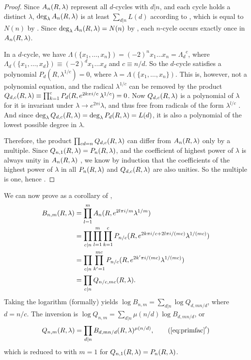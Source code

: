 \documentclass[twocolumn]{revtex4-1}
\begin{document}
\begin{proof}
Since $A_n(R, \lambda)$ represent all $d$-cycles with $d|n$,
and each cycle holds a distinct $\lambda$,
  $\deg_\lambda A_n(R, \lambda)$
  is at least $\sum_{d|n} L(d)$
  according to ,
  which is equal to
  $N(n)$ by .
Since $\deg_\lambda A_n(R, \lambda) = N(n)$ by ,
  each $n$-cycle occurs exactly once in $A_n(R, \lambda)$.


In a $d$-cycle,
 we have $\Lambda(\{x_1, \ldots, x_n\}) = (-2)^n x_1 \dots x_n
   = {\Lambda_d}^c$,
where
$\Lambda_d(\{x_1, \ldots, x_d\}) \equiv (-2)^d x_1 \dots x_d$
and
$c \equiv n/d$.
So the $d$-cycle satisfies a polynomial
  $P_d(R, \lambda^{1/c}) = 0$,
where $\lambda = \Lambda(\{x_1,\ldots,x_n\})$.
%
This is, however, not a polynomial equation, and
%
the radical $\lambda^{1/c}$ can be removed by the product
$Q_{d,c}(R, \lambda)
  \equiv \prod_{k=1}^c P_d(R, e^{2k\pi i/c} \, \lambda^{1/c}) = 0$.
%
Now $Q_{d,c}(R, \lambda)$ is a polynomial of $\lambda$
  for it is invariant under
  $\lambda \rightarrow e^{2\pi i} \lambda$,
and thus free from radicals of the form $\lambda^{l/c}$
  \big[if $(l, c) \ne c$\big].
And since
  $\deg_\lambda Q_{d,c}(R, \lambda)
    = \deg_\lambda P_d(R, \lambda) = L(d)$,
  it is also a polynomial
  of the lowest possible degree in $\lambda$.


Therefore, the product $\prod_{cd=n} Q_{d,c}(R, \lambda)$
  can differ from $A_n(R, \lambda)$ only by
  a multiple.
Since $Q_{n,1}(R, \lambda) = P_n(R, \lambda)$,
  and the coefficient of highest power of $\lambda$ is always
  unity in $A_n(R, \lambda)$ ,
  we know by induction that the coefficients of the highest power of $\lambda$
  in all $P_n(R, \lambda)$ and $Q_{d,c}(R, \lambda)$
  are also unities.
So the multiple is one, hence .
%
%
%
\end{proof}




We can now prove  as a corollary of ,
\begin{align*}
 B_{n, m} (R, \lambda)
 & = \prod_{l = 1}^{m} A_n(R, e^{2l\pi i/m} \lambda^{1/m}) \\
 & = \prod_{c | n} \prod_{l=1}^m \prod_{k=1}^c P_{n/c}(R, e^{2k\pi i/c + 2l\pi i/(m c)} \lambda^{1/(m c)}) \\
 & = \prod_{c | n} \prod_{k'=1}^{m c} P_{n/c}(R, e^{2k'\pi i/(m c)} \lambda^{1/(m c)}) \\
 & = \prod_{c | n} Q_{n /c, m c}(R, \lambda).
\end{align*}
Taking the logarithm (formally) yields
  $\log B_{n, m} = \sum_{d|n} \log Q_{d, m n/d}$,
where $d = n/c$.
The inversion is
  $\log Q_{n, m} = \sum_{d|n} \mu(n/d) \log B_{d, m n/d}$,
or
\begin{equation}
  Q_{n, m}\Rlam
= \prod_{d|n} B_{d, m n/d}\Rlam^{\mu(n/d)},
\tag{$\ref{eq:primfac}'$}
\end{equation}
which is reduced to  with $m = 1$
for $Q_{n, 1}(R, \lambda) = P_n(R, \lambda)$.
\end{document}

